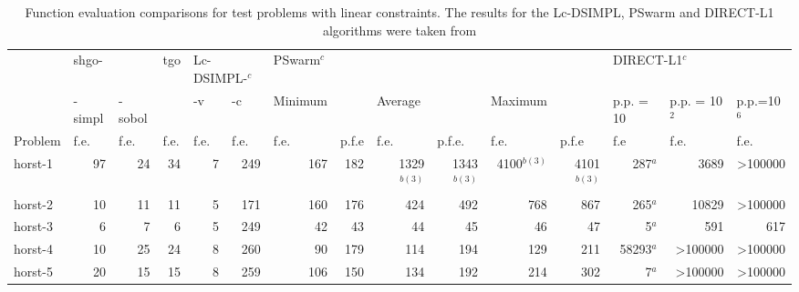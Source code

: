 \setlength{\tabcolsep}{5.5pt}
\begin{landscape}
\begin{table}[htbp]
\caption{Function evaluation comparisons for test problems with linear constraints. The results for the Lc-DSIMPL, PSwarm and DIRECT-L1 algorithms were taken from \cite{Paul2016}}
\begin{tabular}{lrrrrrrrrrrrrrr}
\toprule
 & \multicolumn{1}{l}{shgo-}  & \multicolumn{1}{l}{} & \multicolumn{1}{l}{tgo}  & \multicolumn{2}{l}{Lc-DSIMPL-$^c$}   & \multicolumn{1}{l}{PSwarm$^c$} & \multicolumn{1}{l}{} & \multicolumn{1}{l}{} & \multicolumn{1}{l}{}  & \multicolumn{1}{l}{} & \multicolumn{1}{l}{} & \multicolumn{2}{l}{DIRECT-L1$^c$}  &  \\  \cmidrule(lr){7-12}
 & \multicolumn{1}{l}{-simpl}  & \multicolumn{1}{l}{-sobol} & \multicolumn{1}{l}{}  & \multicolumn{1}{l}{-v} & \multicolumn{1}{l}{-c} & \multicolumn{1}{l}{Minimum} & \multicolumn{1}{l}{} & \multicolumn{1}{l}{Average} & \multicolumn{1}{l}{} & \multicolumn{1}{l}{Maximum} & \multicolumn{1}{l}{} & \multicolumn{1}{l}{p.p. = 10} & \multicolumn{1}{l}{p.p. = 10$^2$} & \multicolumn{1}{l}{p.p.=10$^6$} \\  \cmidrule(lr){2-3} \cmidrule(lr){4-4}  \cmidrule(lr){5-6} \cmidrule(lr){7-8} \cmidrule(lr){9-10} \cmidrule(lr){11-12}  \cmidrule(lr){13-15}
Problem & \multicolumn{1}{l}{f.e.} & \multicolumn{1}{l}{f.e.} & \multicolumn{1}{l}{f.e.} & \multicolumn{1}{l}{f.e.} & \multicolumn{1}{l}{f.e.} & \multicolumn{1}{l}{f.e.} & \multicolumn{1}{l}{p.f.e} & \multicolumn{1}{l}{f.e.} & \multicolumn{1}{l}{p.f.e.} & \multicolumn{1}{l}{f.e.} & \multicolumn{1}{l}{p.f.e} & \multicolumn{1}{l}{f.e} & \multicolumn{1}{l}{f.e.} & \multicolumn{1}{l}{f.e.} \\ 
\midrule
horst-1  & 97 & 24 & 34 & 7 & 249 & 167 & 182 & 1329$^{b(3)}$ & 1343$^{b(3)}$ & 4100$^{b(3)}$ & 4101$^{b(3)}$ & 287$^a$ & 3689 & >100000 \\[0.05cm]
horst-2  & 10 & 11 & 11 & 5 & 171 & 160 & 176 & 424 & 492 & 768 & 867 & 265$^a$ & 10829 & >100000 \\[0.05cm]
horst-3  & 6 & 7 &  6 & 5 & 249 & 42 & 43 & 44 & 45 & 46 & 47 & 5$^a$ & 591 & 617 \\[0.05cm]
horst-4  & 10 & 25 & 24 & 8 & 260 & 90 & 179 & 114 & 194 & 129 & 211 & 58293$^a$ & >100000 & >100000 \\[0.05cm]
horst-5  & 20 & 15 & 15 & 8 & 259 & 106 & 150 & 134 & 192 & 214 & 302 & 7$^a$ & >100000 & >100000 \\[0.05cm]

\end{tabular}
\end{table}
\end{landscape}
